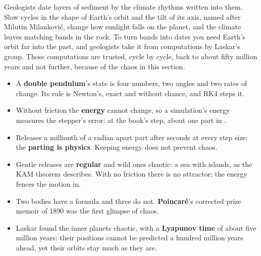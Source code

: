 \begin{worldbox}
Geologists date layers of sediment by the climate rhythms written into them.
Slow cycles in the shape of Earth's orbit and the tilt of its axis, named
after Milutin Milanković, change how sunlight falls on the planet, and the
climate leaves matching bands in the rock. To turn bands into dates you need
Earth's orbit far into the past, and geologists take it from computations by
Laskar's group. Those computations are trusted, cycle by cycle, back to about
fifty million years and not further, because of the chaos in this section.
\end{worldbox}

\begin{summarybox}
\begin{itemize}
\item A \textbf{double pendulum}'s state is four numbers, two angles and two
  rates of change. Its rule is Newton's, exact and without chance, and RK4
  steps it.
\item Without friction the \textbf{energy} cannot change, so a simulation's
  energy measures the stepper's error: at the book's step, about one part in
  .
\item Releases a millionth of a radian apart part after
   seconds at every step size: the \textbf{parting is
  physics}. Keeping energy does not prevent chaos.
\item Gentle releases are \textbf{regular} and wild ones chaotic: a sea with
  islands, as the KAM theorem describes. With no friction there is no
  attractor; the energy fences the motion in.
\item Two bodies have a formula and three do not. \textbf{Poincaré}'s
  corrected prize memoir of 1890 was the first glimpse of chaos.
\item Laskar found the inner planets chaotic, with a \textbf{Lyapunov time}
  of about five million years: their positions cannot be predicted a hundred
  million years ahead, yet their orbits stay much as they are.
\end{itemize}
\end{summarybox}

\canyou

